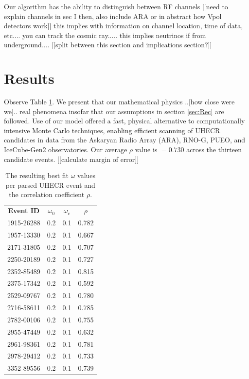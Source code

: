 \documentclass[amsmath,amssymb,aps,prd,10pt,twocolumn,showkeys]{revtex4}
\begin{document}
Our algorithm has the ability to distinguish between RF channels [[need to explain channels in sec I then, also include ARA or in abstract how Vpol detectors work]] 
this implies with information on channel location, time of data, etc.... you can track the cosmic ray..... 
this implies neutrinos if from underground.... 
[[split between this section and implications section?]] 

\section{Results}
Observe Table \ref{tab:results2}. We present that our mathematical physics ..[how close were we].. real phenomena insofar that our assumptions in section \ref{sec:Rec} are followed. Use of our model offered a fast, physical alternative to computationally intensive Monte Carlo techniques, enabling efficient scanning of UHECR candidates in data from the Askaryan Radio Array (ARA), RNO-G, PUEO, and IceCube-Gen2 observatories.
Our average $\rho$ value is $= 0.730$ across the thirteen candidate events. [[calculate margin of error]] 

\label{sec:Res}

\begin{table}
\centering
\begin{tabular}{| c | c | c | c |}
\hline
\textbf{Event ID} & $\omega_0$ & $\omega_c$ & $\rho$ \\
1915-26288 & 0.2 & 0.1 & 0.782 \\
1957-13330 & 0.2 & 0.1 & 0.667 \\
2171-31805 & 0.2 & 0.1 & 0.707 \\
2250-20189 & 0.2 & 0.1 & 0.727 \\
2352-85489 & 0.2 & 0.1 & 0.815 \\
2375-17342 & 0.2 & 0.1 & 0.592 \\
2529-09767 & 0.2 & 0.1 & 0.780 \\
2716-58611 & 0.2 & 0.1 & 0.785 \\
2782-00106 & 0.2 & 0.1 & 0.755 \\
2955-47449 & 0.2 & 0.1 & 0.632 \\
2961-98361 & 0.2 & 0.1 & 0.781 \\
2978-29412 & 0.2 & 0.1 & 0.733 \\
3352-89556 & 0.2 & 0.1 & 0.739 \\
\hline
\end{tabular}
\caption{\label{tab:results2} The resulting best fit $\omega$ values per parsed UHECR event and the correlation coefficient $\rho$. }
\end{table}
\end{document}
